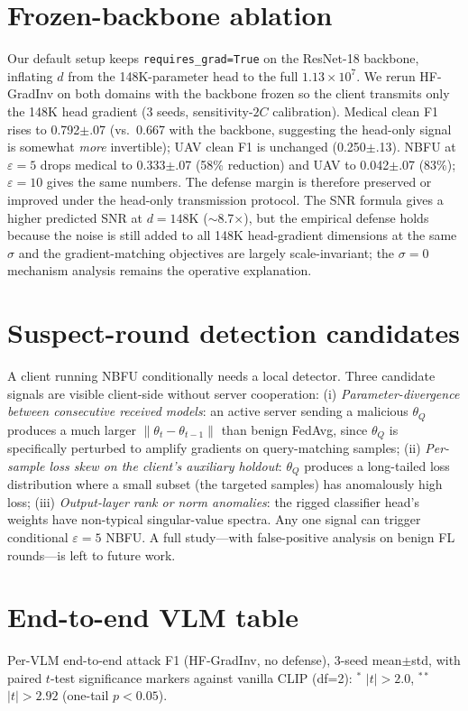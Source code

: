 \documentclass[11pt]{article}
\begin{document}
\section{Frozen-backbone ablation}
\label{app:frozen}
Our default setup keeps \texttt{requires\_grad=True} on the ResNet-18 backbone, inflating $d$ from the 148K-parameter head to the full $1.13{\times}10^{7}$. We rerun HF-GradInv on both domains with the backbone frozen so the client transmits only the 148K head gradient (3 seeds, sensitivity-$2C$ calibration). Medical clean F1 rises to 0.792$\pm$.07 (vs.\ 0.667 with the backbone, suggesting the head-only signal is somewhat \emph{more} invertible); UAV clean F1 is unchanged (0.250$\pm$.13). NBFU at $\varepsilon{=}5$ drops medical to 0.333$\pm$.07 (58\% reduction) and UAV to 0.042$\pm$.07 (83\%); $\varepsilon{=}10$ gives the same numbers. The defense margin is therefore preserved or improved under the head-only transmission protocol. The SNR formula gives a higher predicted SNR at $d{=}148\text{K}$ ($\sim$8.7$\times$), but the empirical defense holds because the noise is still added to all 148K head-gradient dimensions at the same $\sigma$ and the gradient-matching objectives are largely scale-invariant; the $\sigma{=}0$ mechanism analysis remains the operative explanation.

\section{Suspect-round detection candidates}
\label{app:detection}
A client running NBFU conditionally needs a local detector. Three candidate signals are visible client-side without server cooperation: (i) \emph{Parameter-divergence between consecutive received models}: an active server sending a malicious $\theta_Q$ produces a much larger $\|\theta_t - \theta_{t-1}\|$ than benign FedAvg, since $\theta_Q$ is specifically perturbed to amplify gradients on query-matching samples; (ii) \emph{Per-sample loss skew on the client's auxiliary holdout}: $\theta_Q$ produces a long-tailed loss distribution where a small subset (the targeted samples) has anomalously high loss; (iii) \emph{Output-layer rank or norm anomalies}: the rigged classifier head's weights have non-typical singular-value spectra. Any one signal can trigger conditional $\varepsilon{=}5$ NBFU. A full study---with false-positive analysis on benign FL rounds---is left to future work.

\section{End-to-end VLM table}
\label{app:vlm}
Per-VLM end-to-end attack F1 (HF-GradInv, no defense), 3-seed mean$\pm$std, with paired $t$-test significance markers against vanilla CLIP (df=2): $^{*}$ $|t|\!>\!2.0$, $^{**}$ $|t|\!>\!2.92$ (one-tail $p\!<\!0.05$).
\end{document}
